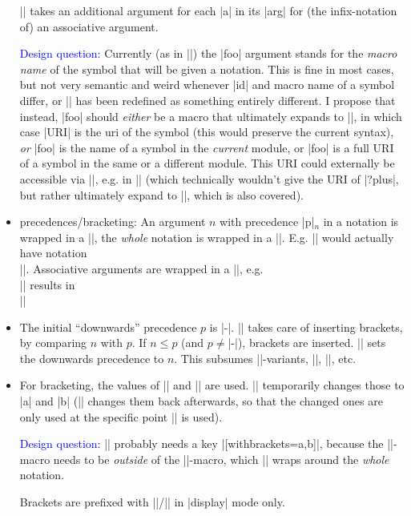 \documentclass{bluenote}
\def\designquestion#1{\textcolor{blue}{#1}}
\begin{document}
\begin{itemize}
    |\notation| takes an additional argument for each |a| in its |arg| for (the infix-notation
    of) an associative argument.

    \designquestion{Design question:} Currently (as in |\symvariant|) the |foo| argument stands for the \emph{macro name}
    of the symbol that will be given a notation. This is fine in most cases, but not very semantic and
    weird whenever |id| and macro name of a symbol differ, or |\foo| has been redefined as something
    entirely different. I propose that instead, |foo| should \emph{either} be a macro
    that ultimately expands to ||, in which case |URI| is the uri
    of the symbol (this would preserve the current syntax), \emph{or} |foo| is the name 
    of a symbol in the \emph{current} module, or |foo| is a full URI of a symbol in
    the same or a different module. This URI could externally be accessible via 
    |\invoke@module|, e.g. in || (which
    technically wouldn't give the URI of |?plus|, but rather ultimately expand to
    ||, which is also covered).

  \item precedences/bracketing: An argument $n$ with precedence |p|$_n$ in a notation is 
  wrapped in a ||, the \emph{whole} notation is wrapped in a
  ||. E.g. || would
  actually have notation\\ 
  ||.
  Associative arguments are wrapped in a |\notation@assoc|, e.g.\\
  || results in\\
  ||
  \item The initial ``downwards'' precedence $p$ is |-\infprec|. ||
    takes care of inserting brackets, by comparing $n$ with $p$. 
    If $n\leq p$ (and $p\neq$|-\infprec|), brackets are inserted.
    || sets the downwards precedence to $n$. This subsumes
    |\mixfix|-variants, |\prefix|, |\suffix|, etc.
  \item For bracketing, the values of |\notation@lparen| and |\notation@rparen| are used.
    || temporarily changes those to |a| and |b| 
    (|\notation@symprec| changes them back afterwards, so that the changed ones are only used
    at the specific point |\withbrackets| is used).

    \designquestion{Design question:} |\notation| probably needs a key 
    |[withbrackets={a,b}]|,
    because the |\withbrackets|-macro needs to be \emph{outside} of the 
    |\notation@symprec|-macro, which |\notation| wraps around the \emph{whole} notation.

    Brackets are prefixed with |\left|/|\right| in |display| mode only.
\end{itemize}
\end{document}
